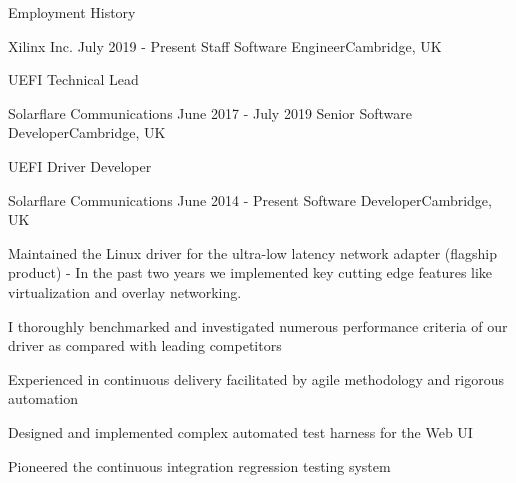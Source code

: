 \documentclass{format/resume} %
\begin{document}
\begin{rSection}{Employment History}
  \begin{rSubsection}{Xilinx Inc.}{ July 2019 - Present } {Staff Software Engineer}{Cambridge, UK}
    \item UEFI Technical Lead
  \end{rSubsection}

  \begin{rSubsection}{Solarflare Communications}{ June 2017 - July 2019 } {Senior Software Developer}{Cambridge, UK}
    \item UEFI Driver Developer
  \end{rSubsection}

  \begin{rSubsection}{Solarflare Communications}{ June 2014 - Present } {Software Developer}{Cambridge, UK}
    \item Maintained the Linux driver for the ultra-low latency network adapter (flagship product) - In the past two years we implemented key cutting edge features like virtualization and overlay networking.
    \item I thoroughly benchmarked and investigated numerous performance criteria of our driver as compared with leading competitors
    \item Experienced in continuous delivery facilitated by agile methodology and rigorous automation
    \item Designed and implemented complex automated test harness for the Web UI
    \item Pioneered the continuous integration regression testing system
  \end{rSubsection}
\end{rSection}
\end{document}
